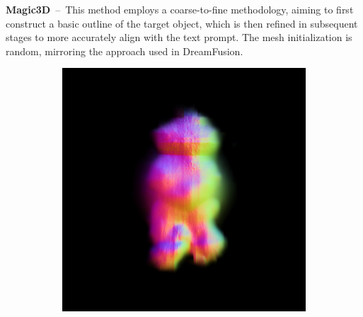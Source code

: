 
\textbf{Magic3D}~--~This method employs a coarse-to-fine methodology, aiming to first construct a basic outline of the target object, which is then refined in subsequent stages to more accurately align with the text prompt. The mesh initialization is random, mirroring the approach used in DreamFusion.

\begin{figure}[H]
    \centering
    \begin{subfigure}[b]{0.15\textwidth}
        \centering
        \fontsize{9pt}{7pt}\selectfont{}\vspace{3cm}
        \fontsize{9pt}{7pt}\selectfont{}\vspace{2.85cm}
        \fontsize{9pt}{7pt}\selectfont{}\vspace{1.95cm}
    \end{subfigure}
    \begin{subfigure}[b]{0.2\textwidth}
        \centering
        \includegraphics[width=\textwidth]{etc/a robot made out of plants/magic3d/magic3D_coarse_robot_0_part2.png}

\end{subfigure}
\end{figure}
